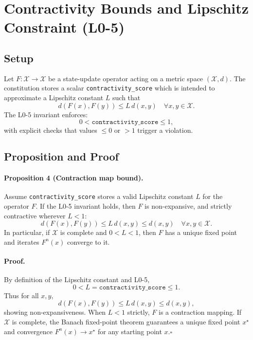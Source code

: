 \documentclass[11pt]{article}
\begin{document}
\section{Contractivity Bounds and Lipschitz Constraint (L0-5)}

\subsection{Setup}

Let \(F : \mathcal{X}\rightarrow\mathcal{X}\) be a state-update operator acting on a metric space \((\mathcal{X}, d)\). The constitution stores a scalar \texttt{contractivity\_score} which is intended to approximate a Lipschitz constant \(L\) such that
\[
  d(F(x), F(y)) \le L\, d(x,y)\quad\forall x,y\in\mathcal{X}.
\]
The L0-5 invariant enforces:\cite{cite:40,cite:42}
\[
  0 < \texttt{contractivity\_score} \le 1,
\]
with explicit checks that values \(\le 0\) or \(>1\) trigger a violation.

\subsection{Proposition and Proof}

\paragraph{Proposition 4 (Contraction map bound).}
Assume \texttt{contractivity\_score} stores a valid Lipschitz constant \(L\) for the operator \(F\). If the L0-5 invariant holds, then \(F\) is non-expansive, and strictly contractive wherever \(L<1\):
\[
  d(F(x),F(y)) \le L\, d(x,y) \le d(x,y)\quad\forall x,y\in\mathcal{X}.
\]
In particular, if \(\mathcal{X}\) is complete and \(0<L<1\), then \(F\) has a unique fixed point and iterates \(F^n(x)\) converge to it.

\paragraph{Proof.}
By definition of the Lipschitz constant and L0-5,
\[
  0 < L = \texttt{contractivity\_score} \le 1.
\]
Thus for all \(x,y\),
\[
  d(F(x),F(y)) \le L\, d(x,y) \le d(x,y),
\]
showing non-expansiveness. When \(L<1\) strictly, \(F\) is a contraction mapping. If \(\mathcal{X}\) is complete, the Banach fixed-point theorem guarantees a unique fixed point \(x^\star\) and convergence \(F^n(x)\rightarrow x^\star\) for any starting point \(x\).\(\square\)
\end{document}
